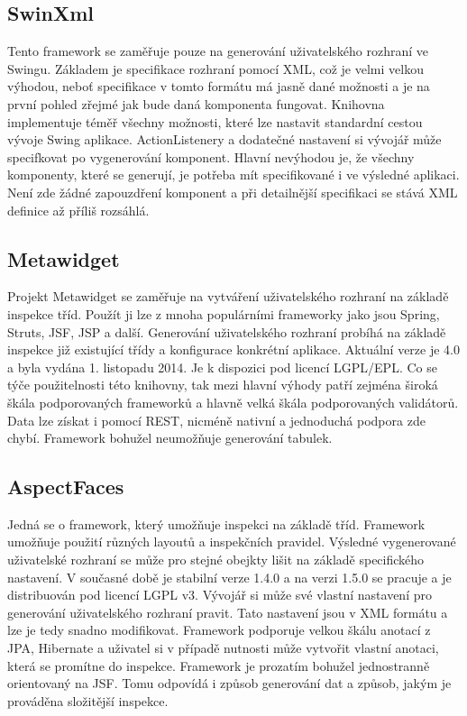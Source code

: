 \subsection{SwinXml}
Tento framework se zaměřuje pouze na generování uživatelského rozhraní ve Swingu. Základem je specifikace rozhraní pomocí XML, což je velmi velkou výhodou, neboť specifikace v tomto formátu má jasně dané možnosti a je na první pohled zřejmé jak bude daná komponenta fungovat. Knihovna implementuje téměř všechny možnosti, které lze nastavit standardní cestou vývoje Swing aplikace. ActionListenery a dodatečné nastavení si vývojář může specifkovat po vygenerování komponent. Hlavní nevýhodou je, že všechny komponenty, které se generují, je potřeba mít specifikované i ve výsledné aplikaci. Není zde žádné zapouzdření komponent a při detailnější specifikaci se stává XML definice až příliš rozsáhlá.
\subsection{Metawidget}
Projekt Metawidget se zaměřuje na vytváření uživatelského rozhraní na základě inspekce tříd. Použít ji lze z mnoha populárními frameworky jako jsou Spring, Struts, JSF, JSP a další. Generování uživatelského rozhraní probíhá na základě inspekce již existující třídy a konfigurace konkrétní aplikace. Aktuální verze je 4.0 a byla vydána 1. listopadu 2014. Je k dispozici pod licencí LGPL/EPL. Co se týče použitelnosti této knihovny, tak mezi hlavní výhody patří zejména široká škála podporovaných frameworků a hlavně velká škála podporovaných validátorů. Data lze získat i pomocí REST, nicméně nativní a jednoduchá podpora zde chybí. Framework bohužel neumožňuje generování tabulek.
\subsection{AspectFaces}
Jedná se o framework, který umožňuje inspekci na základě tříd. Framework umožňuje použití různých layoutů a inspekčních pravidel. Výsledné vygenerované uživatelské rozhraní se může pro stejné obejkty lišit na základě specifického nastavení. V současné době je stabilní verze 1.4.0 a na verzi 1.5.0 se pracuje a je distribuován pod licencí LGPL v3. Vývojář si může své vlastní nastavení pro generování uživatelského rozhraní pravit. Tato nastavení jsou v XML formátu a lze je tedy snadno modifikovat. Framework podporuje velkou škálu anotací z JPA, Hibernate a uživatel si v případě nutnosti může vytvořit vlastní anotaci, která se promítne do inspekce. Framework je prozatím bohužel jednostranně orientovaný na JSF. Tomu odpovídá i způsob generování dat a způsob, jakým je prováděna složitější inspekce. 

